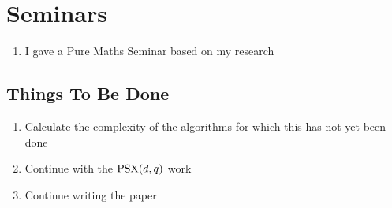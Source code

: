 \documentclass[12pt]{article}
\def\PSX{{\rm PSX}}
\begin{document}
\section{Seminars}

\begin{enumerate}
\item I gave a Pure Maths Seminar based on my research
\end{enumerate}


\subsection{Things To Be Done}

\begin{enumerate}
\item Calculate the complexity of the algorithms for which this has not yet been done

\item Continue with the $\PSX(d, q)$ work

\item Continue writing the paper

\end{enumerate}
\end{document}
